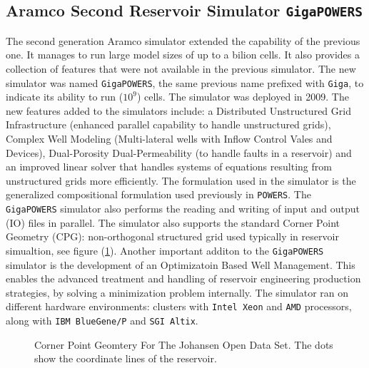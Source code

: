 \documentclass[barcolor=BrickRed,nocopyright,nolists]{asmejour}
\begin{document}
\subsection{Aramco Second Reservoir Simulator \texttt{GigaPOWERS}}
The second generation Aramco simulator extended the capability of the previous one. It manages to run large model sizes of up to a bilion cells. It also provides a collection of features that were not available in the previous simulator. The new simulator was named \texttt{GigaPOWERS}, the same previous name prefixed with \texttt{Giga}, to indicate its 
ability to run ($10^{9}$) cells. The simulator was deployed in 2009\cite{spe119272}. The new features added to the simulators include: a Distributed Unstructured Grid Infrastructure (enhanced parallel capability to handle unstructured grids), Complex Well Modeling (Multi-lateral wells with Inflow Control Vales and Devices), Dual-Porosity Dual-Permeability
(to handle faults in a reservoir) and an improved linear solver that handles systems of equations resulting from unstructured grids more efficiently. The formulation used in the simulator is the generalized compositional formulation used previously in \texttt{POWERS}. The \texttt{GigaPOWERS} simulator also performs the reading and writing of input and output
(IO) files in parallel. The simulator also supports the standard Corner Point Geometry (CPG): non-orthogonal structured grid used typically in reservoir simualtion, see figure (\ref{cpg}). Another important additon to the \texttt{GigaPOWERS} simulator is the development of an Optimizatoin Based Well Management. This enables the advanced treatment and handling of reservoir engineering
production strategies, by solving a minimization problem internally. The simulator ran on different hardware environments: clusters with \texttt{Intel Xeon} and \texttt{AMD} processors, along with \texttt{IBM BlueGene/P} and \texttt{SGI Altix}.
\begin{figure}[h]
	\caption{Corner Point Geomtery For The Johansen Open Data Set. The dots show the coordinate lines of the reservoir\cite{johansen}.}
	\label{cpg}
\end{figure}
\end{document}
